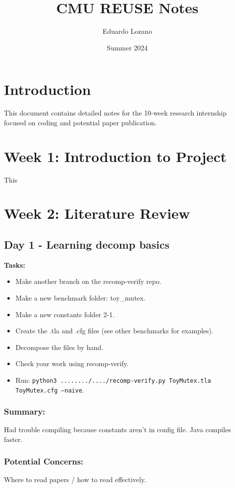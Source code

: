 \documentclass[11pt]{article}
\title{CMU REUSE Notes}
\author{Eduardo Lozano}
\date{Summer 2024}
\begin{document}
\maketitle

{ \hypersetup{hidelinks} \tableofcontents }

\newpage

\section*{Introduction}
This document contains detailed notes for the 10-week research internship focused on coding and potential paper publication.

\section{Week 1: Introduction to Project}
This
\section{Week 2: Literature Review}
\subsection{Day 1 - Learning decomp basics}

\textbf{Tasks:}
\begin{itemize}
  \item Make another branch on the recomp-verify repo.
  \item Make a new benchmark folder: toy\_mutex.
  \item Make a new constants folder 2-1.
  \item Create the .tla and .cfg files (see other benchmarks for examples).
  \item Decompose the files by hand.
  \item Check your work using recomp-verify.
  \item Run: \texttt{python3 ......../..../recomp-verify.py ToyMutex.tla ToyMutex.cfg --naive}.
\end{itemize}

\subsubsection*{Summary:}
Had trouble compiling because constants aren’t in config file. Java compiles faster.

\subsubsection*{Potential Concerns:}
Where to read papers / how to read effectively.
\end{document}
